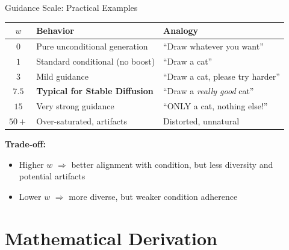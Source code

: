 \documentclass[aspectratio=169, 11pt]{beamer}
\begin{document}
\begin{frame}{Guidance Scale: Practical Examples}

\begin{center}
\renewcommand{\arraystretch}{1.6}
\begin{tabular}{cll}
\toprule
\textbf{$w$} & \textbf{Behavior} & \textbf{Analogy} \\
\midrule
$0$ & Pure unconditional generation & ``Draw whatever you want'' \\
$1$ & Standard conditional (no boost) & ``Draw a cat'' \\
$3$ & Mild guidance & ``Draw a cat, please try harder'' \\
$\mathbf{7.5}$ & \textbf{Typical for Stable Diffusion} & ``Draw a \emph{really good} cat'' \\
$15$ & Very strong guidance & ``ONLY a cat, nothing else!'' \\
$50+$ & Over-saturated, artifacts & Distorted, unnatural \\
\bottomrule
\end{tabular}
\end{center}

\bigskip
\textbf{Trade-off:}
\begin{itemize}
    \item Higher $w$ $\Rightarrow$ better alignment with condition, but less diversity and potential artifacts
    \item Lower $w$ $\Rightarrow$ more diverse, but weaker condition adherence
\end{itemize}

\end{frame}

\section{Mathematical Derivation}
\end{document}
